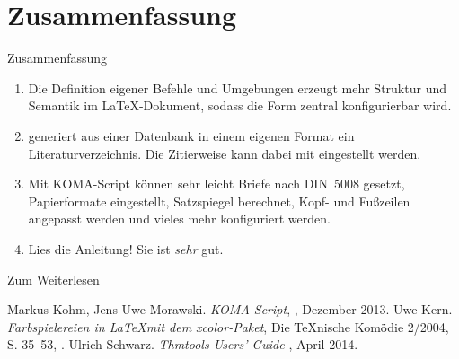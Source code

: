 \malte

\section*{Zusammenfassung}

\begin{frame}[fragile]{Zusammenfassung}
  \begin{enumerate}
    \item Die Definition \alert{eigener Befehle und Umgebungen}
      erzeugt \alert{mehr Struktur} und \alert{Semantik} im \LaTeX-Dokument,
      sodass die \alert{Form zentral konfigurierbar} wird.
    \item \alert{\BibTeX} generiert aus einer \alert{Datenbank} in einem eigenen Format
      ein \alert{Literaturverzeichnis}. Die \alert{Zitierweise} kann dabei mit
      \lstinline-- eingestellt werden.
    \item Mit \alert{KOMA-Script} können sehr leicht \alert{Briefe
          nach DIN~5008} gesetzt, \alert{Papierformate} eingestellt, \alert{Satzspiegel}
      berechnet, \alert{Kopf- und Fußzeilen} angepasst werden und vieles
      mehr konfiguriert werden.
    \item \alert{Lies die Anleitung!} Sie ist \emph{sehr} gut.
  \end{enumerate}
\end{frame}

\begin{Frame}[fragile]{Zum Weiterlesen}
  \begin{mybib}
      Markus Kohm, Jens-Uwe-Morawski.
      \newblock \emph{KOMA-Script},
      \newblock {}, Dezember 2013.
      Uwe Kern.
      \newblock \emph{Farbspielereien in \LaTeX mit dem xcolor-Paket},
      \newblock Die \TeX nische Komödie 2/2004, S. 35--53,
      \newblock {}.
      Ulrich Schwarz.
      \newblock \emph{Thmtools Users’ Guide}
      \newblock {}, April 2014.
  \end{mybib}
\end{Frame}

